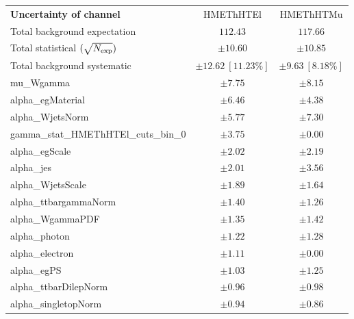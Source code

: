 
\begin{table}
\begin{center}
\setlength{\tabcolsep}{0.0pc}
\begin{tabular*}{\textwidth}{@{\extracolsep{\fill}}lcc}
\noalign{\smallskip}\hline\noalign{\smallskip}
{\bf Uncertainty of channel}                                    & HMEThHTEl            & HMEThHTMu            \\
\noalign{\smallskip}\hline\noalign{\smallskip}
Total background expectation             &  $112.43$        &  $117.66$       \\
\noalign{\smallskip}\hline\noalign{\smallskip}
Total statistical $(\sqrt{N_{\rm exp}})$              & $\pm 10.60$        & $\pm 10.85$       \\
Total background systematic               & $\pm 12.62\ [11.23\%] $        & $\pm 9.63\ [8.18\%] $             \\
\noalign{\smallskip}\hline\noalign{\smallskip}
\noalign{\smallskip}\hline\noalign{\smallskip}
mu\_Wgamma         & $\pm 7.75$          & $\pm 8.15$       \\
alpha\_egMaterial         & $\pm 6.46$          & $\pm 4.38$       \\
alpha\_WjetsNorm         & $\pm 5.77$          & $\pm 7.30$       \\
gamma\_stat\_HMEThHTEl\_cuts\_bin\_0         & $\pm 3.75$          & $\pm 0.00$       \\
alpha\_egScale         & $\pm 2.02$          & $\pm 2.19$       \\
alpha\_jes         & $\pm 2.01$          & $\pm 3.56$       \\
alpha\_WjetsScale         & $\pm 1.89$          & $\pm 1.64$       \\
alpha\_ttbargammaNorm         & $\pm 1.40$          & $\pm 1.26$       \\
alpha\_WgammaPDF         & $\pm 1.35$          & $\pm 1.42$       \\
alpha\_photon         & $\pm 1.22$          & $\pm 1.28$       \\
alpha\_electron         & $\pm 1.11$          & $\pm 0.00$       \\
alpha\_egPS         & $\pm 1.03$          & $\pm 1.25$       \\
alpha\_ttbarDilepNorm         & $\pm 0.96$          & $\pm 0.98$       \\
alpha\_singletopNorm         & $\pm 0.94$          & $\pm 0.86$       \\

\end{tabular*}
\end{center}
\end{table}

